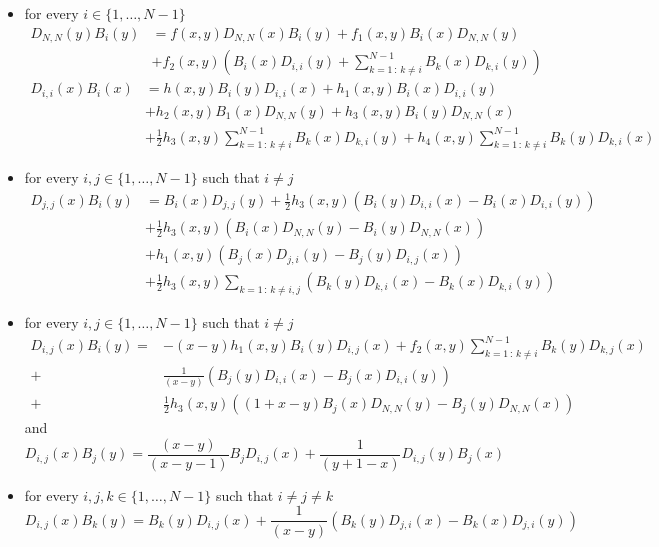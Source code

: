 \documentclass[10pt]{article}
\numberwithin{equation}{section}
\numberwithin{equation}{subsection}
\begin{document}
\begin{itemize}
	\item for every $i\in\{1,\ldots,N-1\}$
	\begin{equation}\label{EX1}
		\begin{split}
			D_{N,N}(y)B_{i}(y)&=f(x,y)D_{N,N}(x)B_{i}(y)+f_{1}(x,y)B_{i}(x)D_{N,N}(y)\\&+f_{2}(x,y)\left(B_{i}(x)D_{i,i}(y)+\sum_{k=1\,:\,k\neq i}^{N-1}B_{k}(x)D_{k,i}(y)\right)
		\end{split}	
	\end{equation}
	\begin{equation}\label{EX2}
		\begin{split}
			D_{i,i}(x)B_{i}(x)&=h(x,y)B_{i}(y)D_{i,i}(x)+h_{1}(x,y)B_{i}(x)D_{i,i}(y)\\&+h_{2}(x,y)B_{1}(x)D_{N,N}(y)+h_{3}(x,y)B_{i}(y)D_{N,N}(x)\\&+\frac{1}{2}h_{3}(x,y)\sum_{k=1\,:\, k\neq i}^{N-1}B_{k}(x)D_{k,i}(y)+h_{4}(x,y)\sum_{k=1\,:\, k\neq i}^{N-1}B_{k}(y)D_{k,i}(x)
		\end{split}
	\end{equation}
	\item  for every $i,j\in \{1,\ldots,N-1\}$ such that $i\neq j$
	\begin{equation}\label{EX3}
		\begin{split}
			D_{j,j}(x)B_{i}(y)&=B_{i}(x)D_{j,j}(y)+\frac{1}{2}h_{3}(x,y)\left(B_{i}(y)D_{i,i}(x)-B_{i}(x)D_{i,i}(y)\right)
			\\&+
			\frac{1}{2}h_{3}(x,y)\left(B_{i}(x)D_{N,N}(y)-B_{i}(y)D_{N,N}(x)\right)
			\\&+
			h_{1}(x,y)\left(B_{j}(x)D_{j,i}(y)-B_{j}(y)D_{i,j}(x)\right)
			\\&+
			\frac{1}{2}h_{3}(x,y)\sum_{k=1\,:\,k\neq i,j}\left(B_{k}(y)D_{k,i}(x)-B_{k}(x)D_{k,i}(y)\right)
		\end{split}
	\end{equation}
\item for every $i,j\in \{1,\ldots,N-1\}$ such that $i\neq j$
\begin{equation}\label{EX4}
	\begin{split}
		D_{i,j}(x)B_{i}(y)=&-(x-y)h_{1}(x,y)B_{i}(y)D_{i,j}(x)+f_{2}(x,y)\sum_{k=1\,:\,k\neq i}^{N-1}B_{k}(y)D_{k,j}(x)\\+&\frac{1}{(x-y)}\left(B_{j}(y)D_{i,i}(x)-B_{j}(x)D_{i,i}(y)\right)\\+&\frac{1}{2}h_{3}(x,y)\left((1+x-y)B_{j}(x)D_{N,N}(y)-B_{j}(y)D_{N,N}(x)\right)
	\end{split}
\end{equation}
and
\begin{equation}\label{EX5}
	D_{i,j}(x)B_{j}(y)=\frac{(x-y)}{(x-y-1)}B_{j}D_{i,j}(x)+\frac{1}{(y+1-x)}D_{i,j}(y)B_{j}(x)
\end{equation}
\item  for every $i,j,k\in \{1,\ldots,N-1\}$ such that $i\neq j\neq k$
\begin{equation}\label{EX6}
	D_{i,j}(x)B_{k}(y)=B_{k}(y)D_{i,j}(x)+\frac{1}{(x-y)}\left(B_{k}(y)D_{j,i}(x)-B_{k}(x)D_{j,i}(y)\right)
\end{equation}
\end{itemize}
\end{document}
